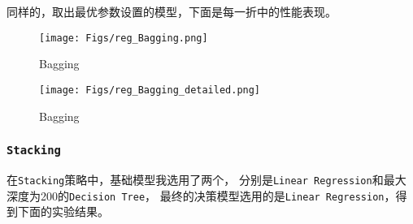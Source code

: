 \documentclass[12pt, a4paper, oneside]{ctexart}
\begin{document}
同样的，取出最优参数设置的模型，下面是每一折中的性能表现。

\begin{figure}[H]
    \centering
    \texttt{[image: Figs/reg\_Bagging.png]}
    \caption{Bagging}
\end{figure}

\begin{figure}[H]
    \centering
    \texttt{[image: Figs/reg\_Bagging\_detailed.png]}
    \caption{Bagging}
\end{figure}

\subsubsection{\texttt{Stacking}}
在\texttt{Stacking}策略中，基础模型我选用了两个，
分别是\texttt{Linear Regression}和最大深度为200的\texttt{Decision Tree}，
最终的决策模型选用的是\texttt{Linear Regression}，得到下面的实验结果。
\end{document}
